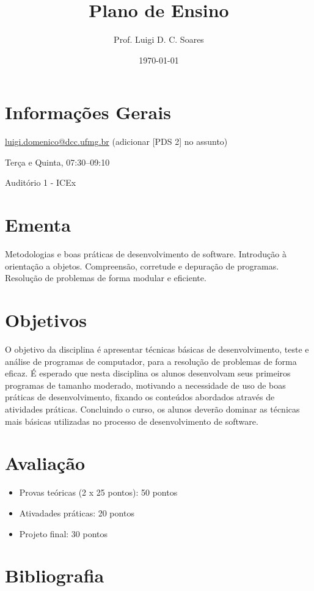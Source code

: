 \documentclass[11pt]{article}
\author{Prof. Luigi D. C. Soares}
\date{\today}
\title{Plano de Ensino}
\begin{document}
\begin{center}
    \Large\bfseries\thetitle{}
\end{center}

\section{Informações Gerais}
\label{sec:org4dc646b}

\begin{description}[noitemsep]
\item[{Contato:}] \href{mailto://luigi.domenico@dcc.ufmg.br}{luigi.domenico@dcc.ufmg.br}
(adicionar [PDS 2] no assunto)
\item[{Dia/Horário:}] Terça e Quinta, 07:30--09:10
\item[{Sala:}] Auditório 1 - ICEx
\end{description}

\section{Ementa}
\label{sec:org7e70cfe}

Metodologias e boas práticas de desenvolvimento de
software. Introdução à orientação a objetos.  Compreensão,
corretude e depuração de programas. Resolução de problemas
de forma modular e eficiente.

\section{Objetivos}
\label{sec:orgf0e0edd}

O objetivo da disciplina é apresentar técnicas básicas de
desenvolvimento, teste e análise de programas de computador,
para a resolução de problemas de forma eficaz. É esperado
que nesta disciplina os alunos desenvolvam seus primeiros
programas de tamanho moderado, motivando a necessidade de
uso de boas práticas de desenvolvimento, fixando os
conteúdos abordados através de atividades
práticas. Concluindo o curso, os alunos deverão dominar as
técnicas mais básicas utilizadas no processo de
desenvolvimento de software.

\section{Avaliação}
\label{sec:org8421abc}

\begin{itemize}
\item Provas teóricas (2 x 25 pontos): 50 pontos
\item Ativadades práticas: 20 pontos
\item Projeto final: 30 pontos
\end{itemize}

\section{Bibliografia}
\label{sec:orga8150d1}

\nocite{*}
\printbibliography[heading=none]
\end{document}
